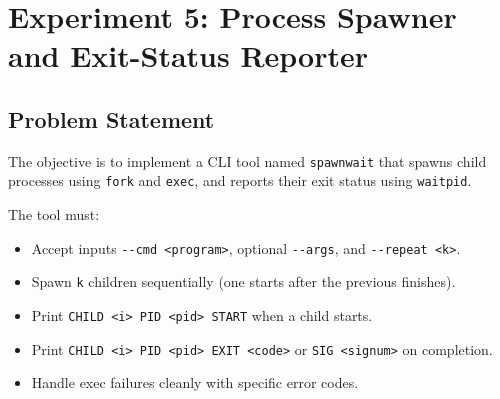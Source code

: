 
\section{Experiment 5: Process Spawner and Exit-Status Reporter}

\subsection{Problem Statement}
The objective is to implement a CLI tool named \texttt{spawnwait} that spawns child processes using \texttt{fork} and \texttt{exec}, and reports their exit status using \texttt{waitpid}.

The tool must:
\begin{itemize}
    \item Accept inputs \verb|--cmd <program>|, optional \verb|--args|, and \verb|--repeat <k>|.
    \item Spawn \verb|k| children sequentially (one starts after the previous finishes).
    \item Print \verb|CHILD <i> PID <pid> START| when a child starts.
    \item Print \verb|CHILD <i> PID <pid> EXIT <code>| or \verb|SIG <signum>| on completion.
    \item Handle exec failures cleanly with specific error codes.
\end{itemize}

